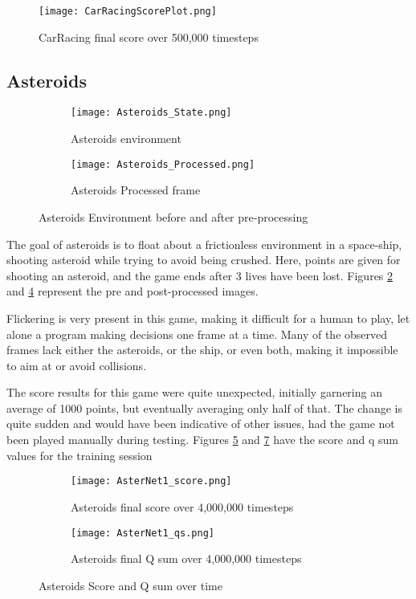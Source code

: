 \documentclass{article}
\begin{document}
\begin{figure}[h]
\centering
  \texttt{[image: CarRacingScorePlot.png]}
  \caption{\label{fig:carnet_score}CarRacing final score over 500,000 timesteps}
\end{figure}

\subsection{Asteroids}

\begin{figure}[h]
\centering
\begin{subfigure}{.6\textwidth}
  \centering
  \texttt{[image: Asteroids\_State.png]}
  \caption{\label{fig:asteroids_state}Asteroids environment}
\end{subfigure}%
\begin{subfigure}{.6\textwidth}
  \centering
  \texttt{[image: Asteroids\_Processed.png]}
  \caption{\label{fig:asteroids_processed}Asteroids Processed frame}
\end{subfigure}
\caption{Asteroids Environment before and after pre-processing}
\end{figure}

The goal of asteroids is to float about a frictionless environment in a space-ship, shooting asteroid while trying to avoid being crushed. Here, points are given for shooting an asteroid, and the game ends after 3 lives have been lost. Figures \ref{fig:asteroids_state} and \ref{fig:asteroids_processed} represent the pre and post-processed images.

Flickering is very present in this game, making it difficult for a human to play, let alone a program making decisions one frame at a time. Many of the observed frames lack either the asteroids, or the ship, or even both, making it impossible to aim at or avoid collisions.

The score results for this game were quite unexpected, initially garnering an average of 1000 points, but eventually averaging only half of that. The change is quite sudden and would have been indicative of other issues, had the game not been played manually during testing. Figures \ref{fig:asteroids_score} and \ref{fig:asteroids_qs} have the score and q sum values for the training session

\begin{figure}[h]
\centering
\begin{subfigure}{.6\textwidth}
  \centering
  \texttt{[image: AsterNet1\_score.png]}
  \caption{\label{fig:asteroids_score}Asteroids final score over 4,000,000 timesteps}
\end{subfigure}%
\begin{subfigure}{.6\textwidth}
  \centering
  \texttt{[image: AsterNet1\_qs.png]}
  \caption{\label{fig:asteroids_qs}Asteroids final Q sum over 4,000,000 timesteps}
\end{subfigure}
\caption{Asteroids Score and Q sum over time}
\end{figure}
\end{document}
